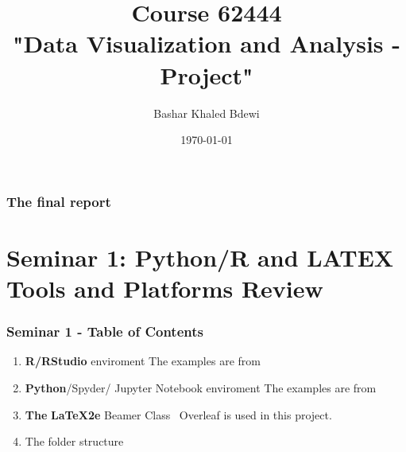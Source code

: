 \documentclass{beamer}
\title[Course 62444]{Course 62444\\"Data Visualization and Analysis - Project"\\
}
\author{Bashar Khaled Bdewi}%
\institute[DTU] %
{
\medskip
\textit{s183356@student.dtu.dk} 
}
\date{\today}
\begin{document}
\begin{frame}
\titlepage %
\end{frame}

\begin{frame}
\frametitle{The final report} %
\tableofcontents
\end{frame}



\section{Seminar 1: Python/R and LATEX Tools and Platforms Review} 
\begin{frame}
\frametitle{Seminar 1 - Table of Contents}
\begin{enumerate}
\item \textbf{R/RStudio} enviroment\newline
\footnotesize The examples are from \cite{Kabacoff2020}\newline

\item \textbf{Python}/Spyder/ Jupyter Notebook enviroment\newline
\footnotesize The examples are from \cite{VanderPlas2016}\newline

\item \textbf{The} \textbf{\LaTeX2e} Beamer Class \newline
\footnotesize\  Overleaf is used in this project.\newline

\item The folder structure
\end{enumerate}
\end{frame}





\end{document}
